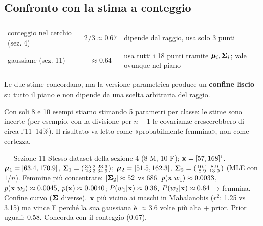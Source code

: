 \subsection{Confronto con la stima a conteggio}
\begin{center}
\begin{tabularx}{\linewidth}{l c Y}
 &  & \\
conteggio nel cerchio (sez. 4) & $2/3\approx0.67$ & dipende dal raggio, usa solo 3 punti\\
gaussiane (sez. 11) & $\approx0.64$ & usa tutti i 18 punti tramite $\bm{\mu}_i,\bm{\Sigma}_i$; vale ovunque nel piano\\
\end{tabularx}
\end{center}
Le due stime concordano, ma la versione parametrica produce un \textbf{confine liscio} su tutto il piano e non dipende da una scelta arbitraria del raggio.
\begin{attenzione}
Con soli 8 e 10 esempi stiamo stimando 5 parametri per classe: le stime sono incerte (per esempio, con la divisione per $n-1$ le covarianze crescerebbero di circa l’11–14\%). Il risultato va letto come «probabilmente femmina», non come certezza.
\end{attenzione}

\begin{appunti}{— Sezione 11}
 Stesso dataset della sezione 4 (8 M, 10 F); $\mathbf{x}=[57,168]^{\mathsf{t}}$.
 $\bm{\mu}_1=[63.4,170.9]$, $\bm{\Sigma}_1=\begin{psmallmatrix}35.2&23.3\\23.3&34.9\end{psmallmatrix}$; $\bm{\mu}_2=[51.5,162.3]$, $\bm{\Sigma}_2=\begin{psmallmatrix}10.1&8.9\\8.9&13.0\end{psmallmatrix}$ (MLE con $1/n$). Femmine più concentrate: $|\bm{\Sigma}_2|\approx52$ vs $686$.
 $p(\mathbf{x}|w_1)\approx0.0033$, $p(\mathbf{x}|w_2)\approx0.0045$, $p(\mathbf{x})\approx0.0040$; $P(w_1|\mathbf{x})\approx0.36$, $P(w_2|\mathbf{x})\approx0.64$ → femmina.
 Confine curvo ($\bm{\Sigma}$ diverse). $\mathbf{x}$ più vicino ai maschi in Mahalanobis ($r^2$: 1.25 vs 3.15) ma vince F perché la sua gaussiana è $\approx3.6$ volte più alta + prior. Prior uguali: 0.58. Concorda con il conteggio (0.67).
\end{appunti}
